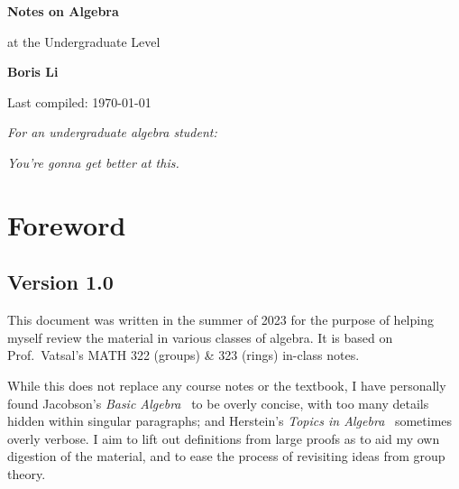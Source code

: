 \begin{titlepage}
\begin{center}
    \vspace*{1cm}
    {\Huge\textbf{Notes on Algebra}}

    \vspace{5mm}
    {\LARGE at the Undergraduate Level}

    \vspace{15mm}
    {\Large\textbf{Boris Li}}

    \vspace*{4cm}

    \vfill

    {\large Last compiled: \today}
\end{center}
\end{titlepage}

\vspace*{30mm}

\begin{center}
    \textit{For an undergraduate algebra student:}

    \vspace{5mm}

    \textit{You're gonna get better at this.}
\end{center}

\chapter{Foreword}

\section*{Version 1.0} 

This document was written in the summer of 2023
for the purpose of helping myself review the material
in various classes of algebra.
It is based on Prof.\ Vatsal's MATH 322 (groups) \& 323 (rings) in-class notes.

While this does not replace any course notes or the textbook,
I have personally found Jacobson's \textit{Basic Algebra}~\cite{jacobson}
to be overly concise,
with too many details hidden within singular paragraphs;
and Herstein's \textit{Topics in Algebra}~\cite{herstein} sometimes overly verbose.
I aim to lift out definitions from large proofs
as to aid my own digestion of the material,
and to ease the process of revisiting ideas from group theory.

